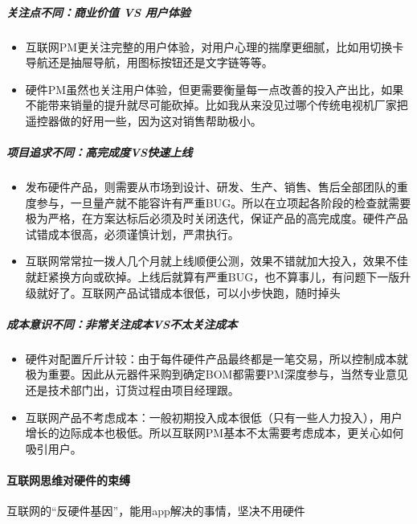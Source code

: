 \documentclass[letterpaper,10pt,english]{sphinxmanual}
\begin{document}
\subparagraph{关注点不同：商业价值 VS 用户体验}
\label{\detokenize{chapter_project/AI_hardware:vs}}\begin{itemize}
\item {} 
互联网PM更关注完整的用户体验，对用户心理的揣摩更细腻，比如用切换卡导航还是抽屉导航，用图标按钮还是文字链等等。

\item {} 
硬件PM虽然也关注用户体验，但更需要衡量每一点改善的投入产出比，如果不能带来销量的提升就尽可能砍掉。比如我从来没见过哪个传统电视机厂家把遥控器做的好用一些，因为这对销售帮助极小。

\end{itemize}


\subparagraph{项目追求不同：高完成度VS快速上线}
\label{\detokenize{chapter_project/AI_hardware:id5}}\begin{itemize}
\item {} 
发布硬件产品，则需要从市场到设计、研发、生产、销售、售后全部团队的重度参与，一旦量产就不能容许有严重BUG。所以在立项起各阶段的检查就需要极为严格，在方案达标后必须及时关闭迭代，保证产品的高完成度。硬件产品试错成本很高，必须谨慎计划，严肃执行。

\item {} 
互联网常常拉一拨人几个月就上线顺便公测，效果不错就加大投入，效果不佳就赶紧换方向或砍掉。上线后就算有严重BUG，也不算事儿，有问题下一版升级就好了。互联网产品试错成本很低，可以小步快跑，随时掉头

\end{itemize}


\subparagraph{成本意识不同：非常关注成本VS不太关注成本}
\label{\detokenize{chapter_project/AI_hardware:id6}}\begin{itemize}
\item {} 
硬件对配置斤斤计较：由于每件硬件产品最终都是一笔交易，所以控制成本就极为重要。因此从元器件采购到确定BOM都需要PM深度参与，当然专业意见还是技术部门出，订货过程由项目经理跟。

\item {} 
互联网产品不考虑成本：一般初期投入成本很低（只有一些人力投入），用户增长的边际成本也极低。所以互联网PM基本不太需要考虑成本，更关心如何吸引用户。

\end{itemize}


\paragraph{互联网思维对硬件的束缚}
\label{\detokenize{chapter_project/AI_hardware:id7}}
互联网的“反硬件基因”，能用app解决的事情，坚决不用硬件
\end{document}
